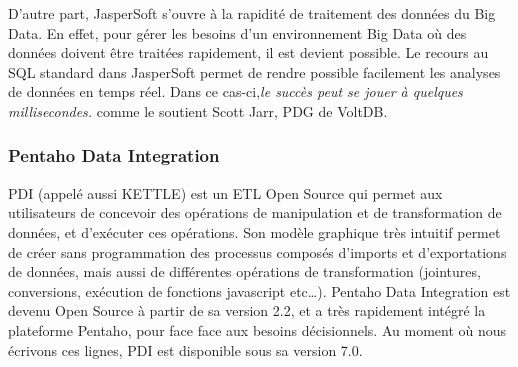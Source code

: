 \documentclass[12pt,a4wide,twoside]{report}
\begin{document}
 	D'autre part, JasperSoft s'ouvre à la rapidité de traitement des données du Big Data. En effet, pour gérer les besoins d'un environnement Big Data où des données doivent être traitées rapidement, il est devient possible. Le recours au SQL standard dans JasperSoft permet de rendre possible facilement les analyses de données en temps réel.\newline 
 Dans ce cas-ci,\emph{le succès peut se jouer à quelques millisecondes.} comme le soutient Scott Jarr, PDG de VoltDB.
 
 \subsubsection{Pentaho Data Integration}
PDI (appelé aussi KETTLE) est un ETL Open Source qui permet aux utilisateurs de concevoir des opérations de manipulation et de transformation de données, et d’exécuter ces opérations. Son modèle graphique très intuitif permet de créer sans programmation des processus composés d’imports et d’exportations de données, mais aussi de différentes opérations de transformation (jointures, conversions, exécution de fonctions javascript etc…).
Pentaho Data Integration est devenu Open Source à partir de sa version 2.2, et a très rapidement intégré la plateforme Pentaho, pour face face aux besoins décisionnels.
Au moment où nous écrivons ces lignes, PDI est disponible sous sa version 7.0.
\end{document}
